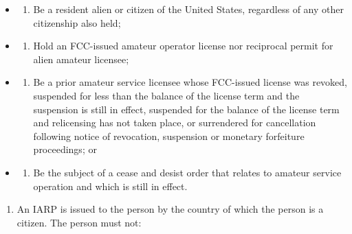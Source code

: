 \documentclass[
  letterpaper,
  DIV=11,
  numbers=noendperiod]{scrreport}
\providecommand{\tightlist}{%
  \setlength{\itemsep}{0pt}\setlength{\parskip}{0pt}}\usepackage{longtable,booktabs,array}
\begin{document}
\begin{itemize}
\item
  \begin{enumerate}
  \def\labelenumi{(\arabic{enumi})}
  \tightlist
  \item
    Be a resident alien or citizen of the United States, regardless of
    any other citizenship also held;
  \end{enumerate}
\item
  \begin{enumerate}
  \def\labelenumi{(\arabic{enumi})}
  \setcounter{enumi}{1}
  \tightlist
  \item
    Hold an FCC-issued amateur operator license nor reciprocal permit
    for alien amateur licensee;
  \end{enumerate}
\item
  \begin{enumerate}
  \def\labelenumi{(\arabic{enumi})}
  \setcounter{enumi}{2}
  \tightlist
  \item
    Be a prior amateur service licensee whose FCC-issued license was
    revoked, suspended for less than the balance of the license term and
    the suspension is still in effect, suspended for the balance of the
    license term and relicensing has not taken place, or surrendered for
    cancellation following notice of revocation, suspension or monetary
    forfeiture proceedings; or
  \end{enumerate}
\item
  \begin{enumerate}
  \def\labelenumi{(\arabic{enumi})}
  \setcounter{enumi}{3}
  \tightlist
  \item
    Be the subject of a cease and desist order that relates to amateur
    service operation and which is still in effect.
  \end{enumerate}
\end{itemize}

\begin{enumerate}
\def\labelenumi{(\alph{enumi})}
\setcounter{enumi}{4}
\tightlist
\item
  An IARP is issued to the person by the country of which the person is
  a citizen. The person must not:
\end{enumerate}
\end{document}
